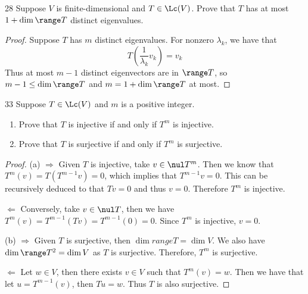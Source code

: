 \documentclass{extarticle}
\begin{document}
\begin{problem}{28}
    Suppose \(V\) is finite-dimensional and \(T \in \Lc(V)\). Prove that \(T\) has at most 
    \(1 + \dim \range T\) distinct eigenvalues. 
\end{problem}

\begin{proof}
Suppose \(T\) has \(m\) distinct eigenvalues. For nonzero \(\lambda_k\), we have that 
\[T \left(\frac{1}{\lambda_k} v_k \right) = v_k\]
Thus at most \(m-1\) distinct eigenvectors are in \(\range T\), so \(m - 1 \leq \dim \range T\)
and \(m = 1 + \dim \range T\) at most. 
\end{proof}



\begin{problem}{33}
    Suppose \(T \in \Lc(V)\) and \(m\) is a positive integer. 
    \begin{enumerate}[label=(\alph*)]
        \item Prove that \(T\) is injective if and only if \(T^m\) is injective. 
        \item Prove that \(T\) is surjective if and only if \(T^m\) is surjective.
    \end{enumerate}
\end{problem}

\begin{proof}
(a) \(\Rightarrow\) Given \(T\) is injective, take \(v \in \nul T^m\). Then we know that 
\(T^m(v) = T(T^{m-1}v) = 0\), which implies that \(T^{m-1}v = 0\). This can be recursively 
deduced to that \(Tv = 0\) and thus \(v = 0\). Therefore \(T^m\) is injective. 

\(\Leftarrow\) Conversely, take \(v \in \nul T\), then we have \(T^m(v)
=T^{m-1}(Tv) = T^{m-1}(0) = 0\). Since \(T^m\) is injective, \(v=0\). 

(b) \(\Rightarrow\) Given \(T\) is surjective, then \(\dim range T = \dim V\). We also have 
\(\dim \range T^2 = \dim V\) as \(T\) is surjective. Therefore, \(T^m\) is surjective. 

\(\Leftarrow\) Let \(w \in V\), then there exists \(v \in V\) such that \(T^m(v) = w\). Then 
we have that let \(u = T^{m-1}(v)\), then \(Tu = w\). Thus \(T\) is also surjective.  
\end{proof}
\end{document}
